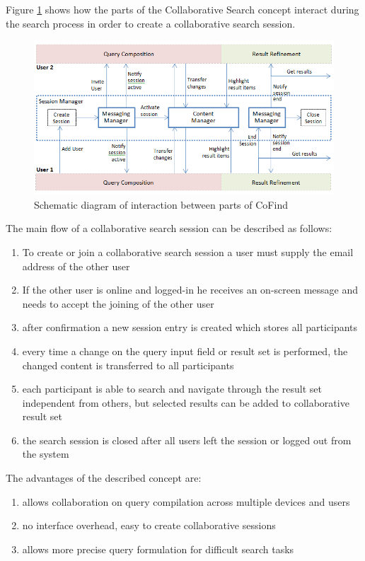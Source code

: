 \documentclass[runningheads,a4paper]{llncs} \usepackage[utf8]{inputenc}
\begin{document}
Figure \ref{fig:cofind} shows how the parts of the Collaborative Search concept
interact during the search process in order to create a collaborative search session.

\begin{figure}[h!]
  \centering
    \includegraphics[width=0.8\linewidth]{resources/cofind-workflow.png}
  \caption{Schematic diagram of interaction between parts of CoFind}
  \label{fig:cofind}
\end{figure}
 
The main flow of a collaborative search session can be described as follows:
\begin{enumerate}
  \item To create or join a collaborative search session a user must supply the
  email address of the other user
  \item If the other user is online and logged-in he receives an on-screen
  message and needs to accept the joining of the other user
  \item after confirmation a new session entry is created which stores all
  participants
  \item every time a change on the query input field or result set is performed,
  the changed content is transferred to all participants 
  \item each participant is able to search and navigate through the result set
  independent from others, but selected results can be added to collaborative
  result set
  \item the search session is closed after all users left the session
  or logged out from the system
\end{enumerate}

The advantages of the described concept are:
\begin{enumerate}
  \item allows collaboration on query compilation across multiple devices and
  users
  \item no interface overhead, easy to create collaborative sessions
  \item allows more precise query formulation for difficult search tasks
\end{enumerate}
\end{document}
